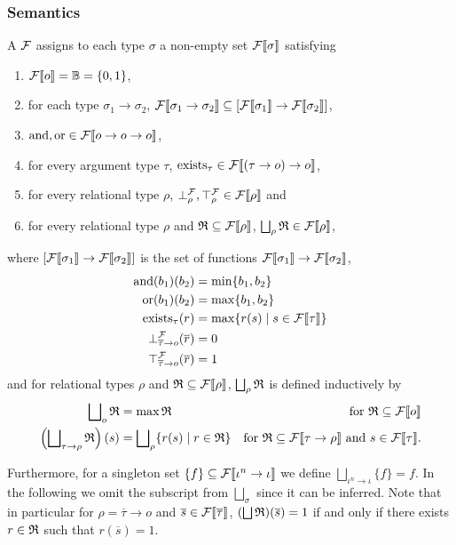 \documentclass[a4paper,twoside,notitlepage,openright,11pt]{report}
\begin{document}
\subsubsection{Semantics}
A  $\mathcal F$ assigns to each type $\sigma$ a non-empty set ${\mathcal F}\llbracket\sigma\rrbracket$ satisfying
\begin{enumerate}[noitemsep]
  \item ${\mathcal F}\llbracket o\rrbracket=\mathbb B=\{0,1\}$,
  \item for each type $\sigma_1\to\sigma_2$, ${\mathcal F}\llbracket\sigma_1\to\sigma_2\rrbracket\subseteq[{\mathcal F}\llbracket\sigma_1\rrbracket\to{\mathcal F}\llbracket\sigma_2\rrbracket]$,
  \item $\operatorname{and},\operatorname{or}\in{\mathcal F}\llbracket o\to o\to o\rrbracket$,
  \item for every argument type $\tau$, $\operatorname{exists}_\tau\in{\mathcal F}\llbracket(\tau\to o)\to o\rrbracket$,
  \item for every relational type $\rho$, $\bot_\rho^\mathcal F,\top_\rho^\mathcal F\in{\mathcal F}\llbracket\rho\rrbracket$ and
  \item for every relational type $\rho$ and $\mathfrak R\subseteq{\mathcal F}\llbracket\rho\rrbracket$, $\bigsqcup_\rho\mathfrak R\in{\mathcal F}\llbracket\rho\rrbracket$,
\end{enumerate}
where $[{\mathcal F}\llbracket\sigma_1\rrbracket\to{\mathcal F}\llbracket\sigma_2\rrbracket]$ is the set of functions ${\mathcal F}\llbracket\sigma_1\rrbracket\to{\mathcal F}\llbracket\sigma_2\rrbracket$,
\begin{align*}
  \operatorname{and}(b_1)(b_2)&=\min\{b_1,b_2\}\\
  \operatorname{or}(b_1)(b_2)&=\max\{b_1,b_2\}\\
  \operatorname{exists}_\tau(r)&=\max\{r(s)\mid s\in{\mathcal F}\llbracket\tau\rrbracket\}\\
  \bot^\mathcal F_{\overline\tau\to o}(\overline r)&= 0\\
  \top^\mathcal F_{\overline\tau\to o}(\overline r)&= 1
\end{align*}
and for relational types $\rho$ and $\mathfrak R\subseteq{\mathcal F}\llbracket\rho\rrbracket$, $\bigsqcup_\rho\mathfrak R$ is defined inductively by 
\begin{align*}
  \bigsqcup\nolimits_o\mathfrak R&=\max\mathfrak R&\text{for }\mathfrak R\subseteq{\mathcal F}\llbracket o\rrbracket\\
  \left(\bigsqcup\nolimits_{\tau\to\rho}\mathfrak R\right)(s)&=\bigsqcup\nolimits_\rho\{r(s)\mid r\in\mathfrak R\}&\text{for $\mathfrak R\subseteq{\mathcal F}\llbracket\tau\to\rho\rrbracket$ and } s\in{\mathcal F}\llbracket\tau\rrbracket.
\end{align*}

Furthermore, for a singleton set $\{f\}\subseteq{\mathcal F}\llbracket\iota^n\to\iota\rrbracket$ we define $\bigsqcup_{\iota^n\to\iota}\{f\}=f$. In the following we omit the subscript from $\bigsqcup_\sigma$ since it can be inferred. Note that in particular for $\rho=\overline\tau\to o$ and $\overline s\in{\mathcal F}\llbracket\overline\tau\rrbracket$, $(\bigsqcup\mathfrak R)(\overline s)=1$ if and only if there exists $r\in\mathfrak R$ such that $r(\overline s)=1$. 
\end{document}
